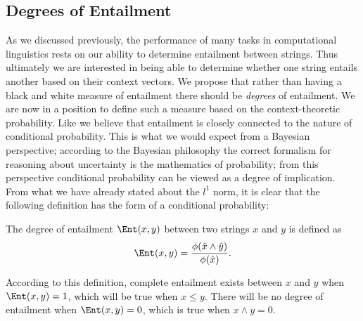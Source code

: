 
\subsection{Degrees of Entailment}

As we discussed previously, the performance of many tasks in computational linguistics rests on our ability to determine entailment between strings. Thus ultimately we are interested in being able to determine whether one string entails another based on their context vectors.
We propose that rather than having a black and white measure of entailment there should be \emph{degrees} of entailment. We are now in a position to define such a measure based on the context-theoretic probability. Like \cite{Glickman:05} we believe that entailment is closely connected to the nature of conditional probability. This is what we would expect from a Bayesian perspective; according to the Bayesian philosophy the correct formalism for reasoning about uncertainty is the mathematics of probability; from this perspective conditional probability can be viewed as a degree of implication. From what we have already stated about the $l^1$ norm, it is clear that the following definition has the form of a conditional probability:
\begin{defn}
The degree of entailment $\Ent(x,y)$ between two strings $x$ and $y$ is defined as
$$\Ent(x,y) = \frac{\phi(\hat{x}\land\hat{y})}{\phi(\hat{x})}.$$
\end{defn}
According to this definition, complete entailment exists between $x$ and $y$ when $\Ent(x,y) = 1$, which will be true when $x \le y$. There will be no degree of entailment when $\Ent(x,y) = 0$, which is true when $x \land y = 0$.


